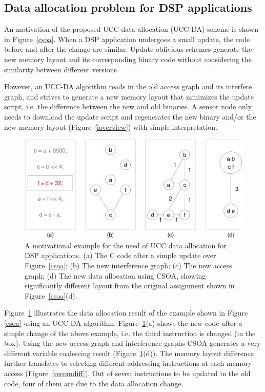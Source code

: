 \subsection{Data allocation problem for DSP applications}

An motivation of the proposed UCC data allocation (UCC-DA) scheme is shown in  Figure~\ref{csoa}. When a DSP application undergoes a small update, the code before and after the change are similar. Update oblivious schemes generate the new memory layout and its corresponding binary code without considering the similarity between different versions. 

However, an UCC-DA algorithm reads in the old access graph and its interfere graph, and strives to generate a new memory layout that minimizes the update script, i.e. the difference between the new and old binaries. A sensor node only needs to download the update script and regenerates the new binary and/or the new memory layout (Figure~\ref{ioverview}) with simple interpretation.

\begin{figure}[ht]
\begin{center}
\includegraphics[scale=0.5]{figures/updcsoa.eps}
\caption[An example for the need of UCC data allocation for DSP applications.]{A motivational example for the need of UCC data allocation for DSP applications.
(a) The C code after a simple update over Figure~\ref{csoa};
(b) The new interference graph;
(c) The new access graph;
(d) The new data allocation using CSOA, showing significantly different layout from the original assignment shown in Figure~\ref{csoa}(d).}
\label{updcsoa}
\end{center}
\vspace{-10mm}
\end{figure}
Figure~\ref{updcsoa} illustrates the data allocation result of the example shown in Figure \ref{csoa} using an UCC-DA algorithm.
Figure~\ref{updcsoa}(a) shows the new code after a simple change of the above example, i.e. the third instruction is changed (in the box). Using the new access graph and interference graphs CSOA generates a very different variable coalescing result (Figure~\ref{updcsoa}(d)). The memory layout difference further translates to selecting different addressing instructions at each memory access (Figure~\ref{recomdiff}). Out of seven instructions to be updated in the old code, four of them are due to the data allocation change.

